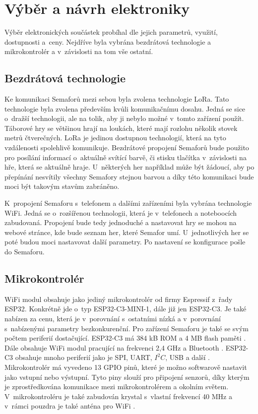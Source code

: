 \chapter{Výběr a návrh elektroniky}
Výběr elektronických součástek probíhal dle jejich parametrů, využití, dostupnosti a~ceny. Nejdříve byla vybrána bezdrátová technologie a mikrokontrolér a v~závislosti 
na tom vše ostatní. 

\section{Bezdrátová technologie}
Ke komunikaci Semaforů mezi sebou byla zvolena technologie LoRa. Tato technologie byla zvolena především kvůli komunikačnímu dosahu. Jedná se sice o~dražší technologii, 
ale na tolik, aby ji nebylo možné v~tomto zařízení použít. Táborové hry se většinou hrají na loukách, které mají rozlohu několik stovek metrů čtverečných. LoRa je jedinou
dostupnou technologií, která na tyto vzdálenosti spolehlivě komunikuje. Bezdrátové propojení Semaforů bude použito pro posílání informací o~aktuálně svítící barvě, či 
stisku tlačítka v~závislosti na hře, která se aktuálně hraje. U~některých her například může být žádoucí, aby po přepínání nesvítily všechny Semafory stejnou barvou 
a díky této komunikaci bude moci být takovým stavům zabráněno. 


K~propojení Semaforu s~telefonem a dalšími zařízeními byla vybrána technologie WiFi. Jedná se o~rozšířenou technologii, která je v~telefonech a noteboocích zabudovaná. 
Propojení bude tedy jednoduché a nastavovat hry se mohou na webové stránce, kde bude seznam her, které Semafor umí. U~jednotlivých her se poté budou moci nastavovat 
další parametry. Po nastavení se konfigurace pošle do Semaforu. 

\section{Mikrokontrolér}
WiFi modul obsahuje jako jediný mikrokontrolér od firmy Espressif z~řady ESP32. Konkrétně jde o~typ ESP32-C3-MINI-1, dále již jen ESP32-C3. Je také nabízen za cenu, která 
je v~porovnání s~ostatními nízká a v~porovnání s~nabízenými parametry bezkonkurenční. Pro zařízení Semaforu je také se svým počtem periferií dostačující. ESP32-C3 má 
384 kB ROM a 4 MB flash paměti \cite{ESP_C3_dtsh}. Dále obsahuje WiFi modul pracující na frekvenci 2,4 GHz a Bluetooth \cite{ESP_C3_dtsh}. ESP32-C3 obsahuje mnoho periferií
jako je SPI, UART, $I^2C$, USB a další \cite{ESP_C3_dtsh}. Mikrokontrolér má vyvedeno 13 GPIO pinů, které je možno softwarově nastavit jako vstupní nebo výstupní. Tyto piny
slouží pro připojení senzorů, díky kterým je zprostředkována komunikace mezi mikrokontrolérem a okolním světem. V~mikrokontroléru je také zabudován krystal s~vlastní frekvencí 
40 MHz a v~rámci pouzdra je také anténa pro WiFi \cite{ESP_C3_dtsh}.

